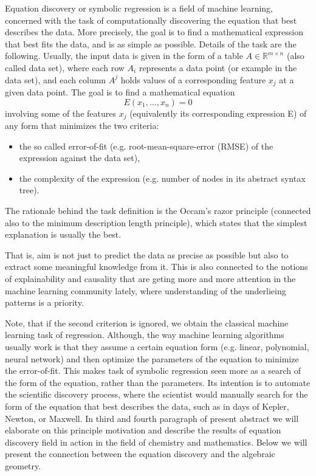\documentclass[runningheads]{llncs}
\begin{document}
Equation discovery or symbolic regression is a field of machine learning, concerned with 
the task of computationally discovering the equation that best describes the data.
More precisely, the goal is to find a mathematical expression that best fits the data, and is as simple as possible.
Details of the task are the following.
Usually, the input data is given in the form of a table $A \in \mathbb{R}^{m \times n}$ (also called data set), where each row $A_i$ represents a data point (or example in the data set), and each column $A^j$ holds values of a corresponding
feature $x_j$ at a given data point.
The goal is to find a mathematical equation 
    $$E(x_1, ..., x_n) = 0$$ 
    involving some of the features $x_j$ 
    (equivalently its corresponding expression E) of any form that minimizes the two criteria: 
    \begin{itemize}
        \item the so called error-of-fit (e.g. root-mean-square-error (RMSE) of the expression against the data set), 
        \item the complexity of the expression (e.g. number of nodes in its abstract syntax tree).
    \end{itemize}
The rationale behind the task definition is the Occam's razor principle (connected also to the minimum description length principle),
which states that the simplest explanation is usually the best.

That is, aim is not just to predict the data as precise as possible but 
also to extract some meaningful knowledge from it.
This is also connected to the notions of explainability and causality
that are geting more and more attention 
in the machine learning community lately,
where understanding of the underlieing patterns is a priority.

Note, that if the second criterion is ignored, we obtain the classical machine learning task of regression.
Although, the way machine learning algorithms usually work is that they assume a certain equation form 
(e.g. linear, polynomial, neural network) and then optimize the parameters of the equation to minimize the error-of-fit.
This makes task of symbolic regression seen more as a search of the form of the equation, rather than the parameters.
Its intention is to automate the scientific discovery process, where the scientist would manually search for 
the form of the equation that best describes the data, such as in days of Kepler, Newton, or Maxwell.
In third and fourth paragraph of present abstract we will elaborate on this principle motivation and describe
the results of equation discovery field in action in the field of chemistry and mathematics.
Below we will present the connection between the equation discovery and the algebraic geometry.
\end{document}
